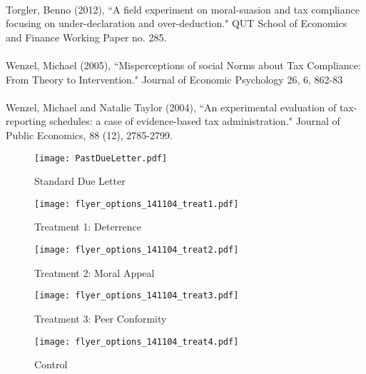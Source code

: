 \documentclass[12pt,titlepage]{article}
\begin{document}
\\
Torgler, Benno (2012),  ``A field experiment on moral-suasion and tax compliance focusing on under-declaration
and over-deduction." QUT School of Economics and Finance Working Paper no. 285. \\
\\
Wenzel, Michael (2005), ``Misperceptions of social Norms about Tax Compliance: From Theory to Intervention." Journal of Economic Psychology 26, 6, 862-83\\
\\
Wenzel, Michael and Natalie Taylor (2004),  ``An experimental evaluation of tax-reporting schedules: a case of
evidence-based tax administration." Journal of Public Economics, 88 (12), 2785-2799.


\newpage

\begin{figure}[htpb]
\begin{center}
\caption{Standard Due Letter}
\bigskip
\texttt{[image: PastDueLetter.pdf]}
\end{center}
\end{figure}
\newpage
\begin{figure}[htpb]
\begin{center}
\caption{Treatment 1: Deterrence}
\bigskip
\texttt{[image: flyer\_options\_141104\_treat1.pdf]}
\end{center}
\end{figure}
\newpage
\begin{figure}[htpb]
\begin{center}
\caption{Treatment 2: Moral Appeal}
\bigskip
\texttt{[image: flyer\_options\_141104\_treat2.pdf]}
\end{center}
\end{figure}
\newpage
\begin{figure}[htpb]
\begin{center}
\caption{Treatment 3: Peer Conformity}
\bigskip
\texttt{[image: flyer\_options\_141104\_treat3.pdf]}
\end{center}
\end{figure}
\newpage
\begin{figure}[htpb]
\begin{center}
\caption{Control}
\bigskip
\texttt{[image: flyer\_options\_141104\_treat4.pdf]}
\end{center}
\end{figure}
\newpage
\end{document}
